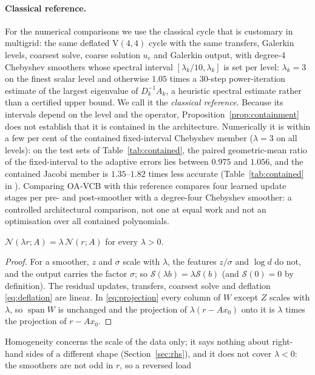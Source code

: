 \paragraph{Classical reference.} For the numerical comparisons we use the classical cycle that is customary in multigrid: the
same deflated V$(4,4)$ cycle with the same transfers, Galerkin levels, coarsest solve, coarse solution $u_c$ and Galerkin
output, with degree-4 Chebyshev smoothers whose spectral interval $[\lambda_k/10,\lambda_k]$ is set per level: $\lambda_k = 3$
on the finest scalar level and otherwise $1.05$ times a 30-step power-iteration estimate of the largest eigenvalue of
$D_k^{-1}A_k$, a heuristic spectral estimate rather than a certified upper bound. We call it the \emph{classical reference}.
Because its intervals depend on the level and the operator, Proposition~\ref{prop:containment} does not establish that it is
contained in the architecture. Numerically it is within a few per cent of the contained fixed-interval Chebyshev member
($\lambda = 3$ on all levels): on the test sets of Table~\ref{tab:contained}, the paired geometric-mean ratio of the
fixed-interval to the adaptive errors lies between $0.975$ and $1.056$, and the contained Jacobi member is $1.35$--$1.82$ times
less accurate (Table~\ref{tab:contained} in ). Comparing OA-VCB with this reference compares four learned
update stages per pre- and post-smoother with a degree-four Chebyshev smoother: a controlled architectural comparison, not one
at equal work and not an optimisation over all contained polynomials.
\begin{proposition}\label{prop:homogeneity}
$\mathcal{N}(\lambda r; A) = \lambda\,\mathcal{N}(r; A)$ for every $\lambda > 0$.
\end{proposition}
\begin{proof}
For a smoother, $z$ and $\sigma$ scale with $\lambda$, the features $z/\sigma$ and $\log d$ do not, and the output carries
the factor $\sigma$; so $\mathcal{S}(\lambda b) = \lambda\mathcal{S}(b)$ (and $\mathcal{S}(0) = 0$ by definition). The residual updates, transfers, coarsest solve
and deflation \eqref{eq:deflation} are linear. In \eqref{eq:projection} every column of $W$ except $Z$ scales with
$\lambda$, so $\operatorname{span}W$ is unchanged and the projection of $\lambda(r - Ax_0)$ onto it is $\lambda$ times
the projection of $r - Ax_0$.
\end{proof}
Homogeneity concerns the scale of the data only; it says nothing about right-hand sides of a different shape
(Section~\ref{sec:rhs}), and it does not cover $\lambda<0$: the smoothers are not odd in $r$, so a reversed load
